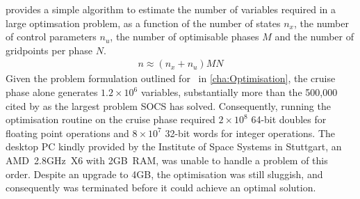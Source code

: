 



\textcite{Betts1998} provides a simple algorithm to estimate the number of variables required in a large optimsation problem, as a function of the number of states $n_x$, the number of control parameters $n_u$, the number of optimisable phases $M$ and the number of gridpoints per phase $N$.
\begin{gather}
n \approx (n_x + n_u)MN %
\end{gather} %
Given the problem formulation outlined for \BW\ in \autoref{cha:Optimisation}, the cruise phase alone generates $1.2\times10^6$ variables, substantially more than the 500,000 cited by \textcite{ASTOS_guide} as the largest problem SOCS has solved. Consequently, running the optimisation routine on the cruise phase required $2\times10^8$ 64-bit doubles for floating point operations and $8\times10^7$ 32-bit words for integer operations. The desktop PC kindly provided by the Institute of Space Systems in Stuttgart, an AMD~2.8GHz~X6 with 2GB~RAM, was unable to handle a problem of this order. Despite an upgrade to 4GB, the optimisation was still sluggish, and consequently was terminated before it could achieve an optimal solution. 


